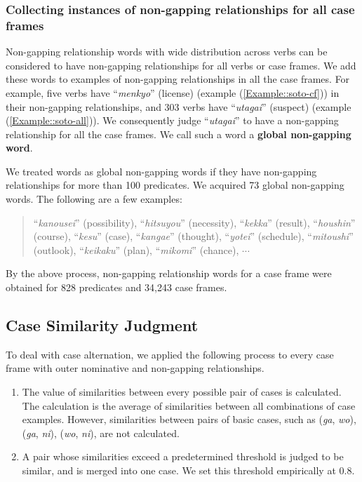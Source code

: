 \documentclass[english]{jnlp_1.4_rep}
\begin{document}
\subsubsection*{Collecting instances of non-gapping relationships for all case frames}

Non-gapping relationship words with wide distribution across verbs can
be considered to have non-gapping relationships for all verbs or case
frames. We add these words to examples of non-gapping relationships in all
the case frames. For example, five verbs have ``\textit{menkyo}'' (license)
(example (\ref{Example::soto-cf})) in their non-gapping relationships, and
303 verbs have ``\textit{utagai}'' (suspect) (example
(\ref{Example::soto-all})). We consequently judge ``\textit{utagai}'' to
have a non-gapping relationship for all the case frames. We call such a word
a \textbf{global non-gapping word}.

We treated words as global non-gapping words if they have non-gapping
relationships for more than 100 predicates. We acquired 73 global
non-gapping words. The following are a few examples:
\begin{quote}
 ``\textit{kanousei}'' (possibility), ``\textit{hitsuyou}'' (necessity),
 ``\textit{kekka}'' (result), ``\textit{houshin}'' (course), ``\textit{kesu}''
 (case), ``\textit{kangae}'' (thought), ``\textit{yotei}'' (schedule),
 ``\textit{mitoushi}'' (outlook), ``\textit{keikaku}'' (plan), ``\textit{mikomi}'' (chance), $\cdots$
\end{quote}

By the above process, non-gapping relationship words for a case frame were
obtained for 828 predicates and 34,243 case frames.


\subsection{Case Similarity Judgment}

To deal with case alternation, we applied the following process to every case
frame with outer nominative and non-gapping relationships.
\begin{enumerate}
 \item The value of similarities between every possible pair of cases is
       calculated. The calculation is the average
       of similarities between all combinations of case examples.
       However, similarities between pairs of basic cases,
       such as (\textit{ga}, \textit{wo}), (\textit{ga}, \textit{ni}),
       (\textit{wo}, \textit{ni}), are not calculated.
 \item A pair whose similarities exceed a predetermined threshold is judged to be
       similar, and is merged into one case. We set this threshold
       empirically at 0.8.
\end{enumerate}
\end{document}
